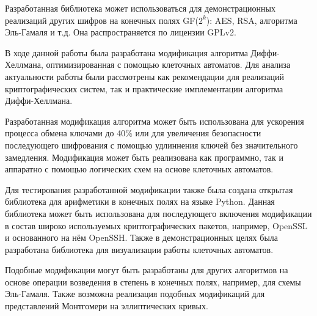 \documentclass[times,specification,annotation]{itmo-student-thesis}
\begin{document}
Разработанная библиотека может использоваться для демонстрационных реализаций других шифров на конечных полях GF($2^k$):
AES, RSA, алгоритма Эль-Гамаля и т.д.
Она распространяется по лицензии GPLv2.

\startconclusionpage

В ходе данной работы была разработана модификация алгоритма Диффи-Хеллмана, оптимизированная с помощью клеточных автоматов.
Для анализа актуальности работы были рассмотрены как рекомендации для реализаций криптографических систем,
так и практические имплементации алгоритма Диффи-Хеллмана.

Разработанная модификация алгоритма может быть использована для ускорения процесса обмена ключами до 40\% или для
увеличения безопасности последующего шифрования с помощью удлиннения ключей без значительного замедления.
Модификация может быть реализована как программно, так и аппаратно с помощью логических схем на основе клеточных автоматов.

Для тестирования разработанной модификации также была создана открытая библиотека для арифметики в конечных полях на языке Python.
Данная библиотека может быть использована для последующего включения модификации в состав широко используемых
криптографических пакетов, например, OpenSSL и основанного на нём OpenSSH.
Также в демонстрационных целях была разработана библиотека для визуализации работы клеточных автоматов.

Подобные модификации могут быть разработаны для других алгоритмов на основе операции возведения в степень в конечных полях,
например, для схемы Эль-Гамаля.
Также возможна реализация подобных модификаций для представлений Монтгомери на эллиптических кривых.

\printmainbibliography
\end{document}
